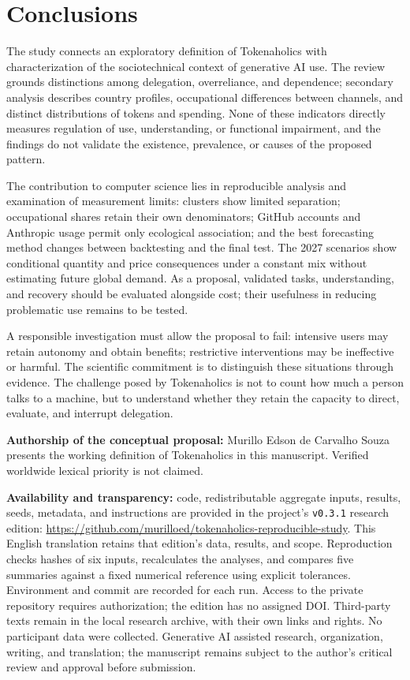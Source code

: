 \documentclass[11pt,a4paper]{article}
\begin{document}
\section{Conclusions}
The study connects an exploratory definition of Tokenaholics with characterization of the sociotechnical context of generative AI use. The review grounds distinctions among delegation, overreliance, and dependence; secondary analysis describes country profiles, occupational differences between channels, and distinct distributions of tokens and spending. None of these indicators directly measures regulation of use, understanding, or functional impairment, and the findings do not validate the existence, prevalence, or causes of the proposed pattern.

The contribution to computer science lies in reproducible analysis and examination of measurement limits: clusters show limited separation; occupational shares retain their own denominators; GitHub accounts and Anthropic usage permit only ecological association; and the best forecasting method changes between backtesting and the final test. The 2027 scenarios show conditional quantity and price consequences under a constant mix without estimating future global demand. As a proposal, validated tasks, understanding, and recovery should be evaluated alongside cost; their usefulness in reducing problematic use remains to be tested.

A responsible investigation must allow the proposal to fail: intensive users may retain autonomy and obtain benefits; restrictive interventions may be ineffective or harmful. The scientific commitment is to distinguish these situations through evidence. The challenge posed by Tokenaholics is not to count how much a person talks to a machine, but to understand whether they retain the capacity to direct, evaluate, and interrupt delegation.

\noindent\textbf{Authorship of the conceptual proposal:} Murillo Edson de Carvalho Souza presents the working definition of Tokenaholics in this manuscript. Verified worldwide lexical priority is not claimed.

\medskip
\noindent\textbf{Availability and transparency:} code, redistributable aggregate inputs, results, seeds, metadata, and instructions are provided in the project's \texttt{v0.3.1} research edition: \url{https://github.com/murilloed/tokenaholics-reproducible-study}. This English translation retains that edition's data, results, and scope. Reproduction checks hashes of six inputs, recalculates the analyses, and compares five summaries against a fixed numerical reference using explicit tolerances. Environment and commit are recorded for each run. Access to the private repository requires authorization; the edition has no assigned DOI. Third-party texts remain in the local research archive, with their own links and rights. No participant data were collected. Generative AI assisted research, organization, writing, and translation; the manuscript remains subject to the author's critical review and approval before submission.



\end{document}
